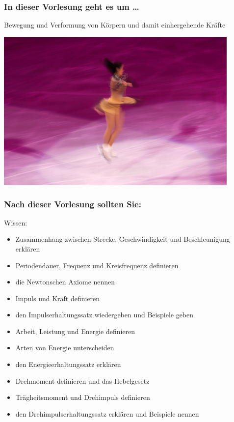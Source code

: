 \documentclass{beamer}
\begin{document}
\begin{frame}
\frametitle{In dieser Vorlesung geht es um \dots}

Bewegung und Verformung von Körpern und damit einhergehende Kräfte

\begin{center}
\includegraphics[width=0.9\textwidth]{figureskater.jpg}
\end{center}

 
\end{frame}



 
\begin{frame}

\frametitle{Nach dieser Vorlesung sollten Sie:}



\begin{block}{Wissen:}
\begin{itemize}
\item
Zusammenhang zwischen Strecke, Geschwindigkeit und Beschleunigung erklären
\item
Periodendauer, Frequenz und Kreisfrequenz definieren
\item
die Newtonschen Axiome nennen
\item
Impuls und Kraft definieren
\item
den  Impulserhaltungssatz wiedergeben und Beispiele geben
\item
Arbeit, Leistung und Energie definieren
\item
Arten von Energie unterscheiden
\item
den Energieerhaltungssatz erklären
\item
Drehmoment definieren und das Hebelgesetz
\item
Trägheitsmoment und Drehimpuls definieren
\item
den Drehimpulserhaltungssatz erklären und Beispiele nennen 
\end{itemize}

\end{block}

\end{frame}
\end{document}
